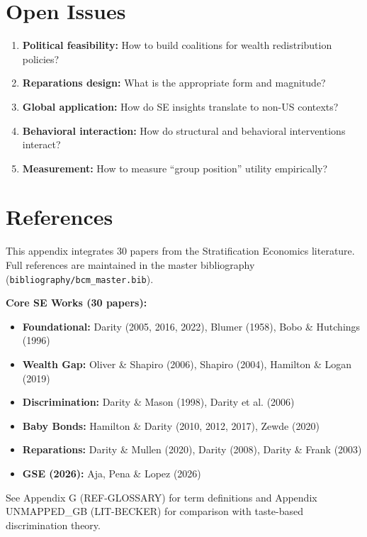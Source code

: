 \section{Open Issues}
\label{sec:se-open}

\begin{enumerate}
    \item \textbf{Political feasibility:} How to build coalitions for wealth redistribution policies?
    \item \textbf{Reparations design:} What is the appropriate form and magnitude?
    \item \textbf{Global application:} How do SE insights translate to non-US contexts?
    \item \textbf{Behavioral interaction:} How do structural and behavioral interventions interact?
    \item \textbf{Measurement:} How to measure ``group position'' utility empirically?
\end{enumerate}

\section{References}
\label{sec:se-references}

\nocite{bcm_master}

This appendix integrates 30 papers from the Stratification Economics literature. Full references are maintained in the master bibliography (\texttt{bibliography/bcm\_master.bib}).

\textbf{Core SE Works (30 papers):}
\begin{itemize}
    \item \textbf{Foundational:} Darity (2005, 2016, 2022), Blumer (1958), Bobo \& Hutchings (1996)
    \item \textbf{Wealth Gap:} Oliver \& Shapiro (2006), Shapiro (2004), Hamilton \& Logan (2019)
    \item \textbf{Discrimination:} Darity \& Mason (1998), Darity et al. (2006)
    \item \textbf{Baby Bonds:} Hamilton \& Darity (2010, 2012, 2017), Zewde (2020)
    \item \textbf{Reparations:} Darity \& Mullen (2020), Darity (2008), Darity \& Frank (2003)
    \item \textbf{GSE (2026):} Aja, Pena \& Lopez (2026)
\end{itemize}

See Appendix G (REF-GLOSSARY) for term definitions and Appendix UNMAPPED_GB (LIT-BECKER) for comparison with taste-based discrimination theory.


